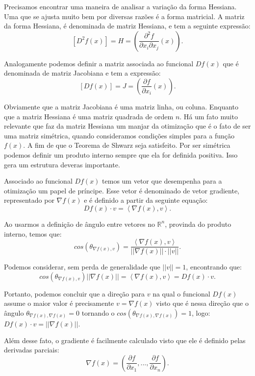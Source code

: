 \par Precisamos encontrar uma maneira de analisar a variação da forma Hessiana. Uma que se ajusta muito bem por diversas razões é a forma matricial. A matriz da forma Hessiana, é denominada de matriz Hessiana, e tem a seguinte expressão:
$$[D^2f(x)] = H = \left(\frac{\partial^2 f}{\partial x_i \partial x_j }(x)\right).$$
\par Analogamente podemos definir a matriz associada ao funcional $Df(x)$ que é denominada de matriz Jacobiana e tem a expressão:
$$[Df(x)] = J = \left(\frac{\partial f}{\partial x_i}(x)\right).$$
\par Obviamente que a matriz Jacobiana é uma matriz linha, ou coluna. Enquanto que a matriz Hessiana é uma matriz quadrada de ordem $n$. Há um fato muito relevante que faz da matriz Hessiana um manjar da otimização que é o fato de ser uma matriz simétrica, quando consideramos condições simples para a função $f(x)$. A fim de que o Teorema de Shwarz seja satisfeito. Por ser simétrica podemos definir um produto interno sempre que ela for definida positiva. Isso gera um estrutura deveras importante. 
\par Associado ao funcional $Df(x)$ temos um vetor que desempenha para a otimização um papel de príncipe. Esse vetor é denominado de vetor gradiente, representado por $\nabla f(x)$ e é definido a partir da seguinte equação:
$$Df(x) \cdot v = \left\langle \nabla f(x), v\right\rangle.$$
\par Ao usarmos a definição de ângulo entre vetores no $\mathbb{R}^n$, provinda do produto interno, temos que:
$$cos(\theta_{\nabla f(x),v}) = \frac{\left\langle \nabla f(x), v\right\rangle}{||\nabla f(x)||\cdot ||v||}.$$
\par Podemos considerar, sem perda de generalidade que $||v||=1$, encontrando que:
$$cos(\theta_{\nabla f(x),v})  ||\nabla f(x)|| = \left\langle \nabla f(x), v\right\rangle = Df(x) \cdot v .$$
\par Portanto, podemos concluir que a direção para $v$ na qual o funcional $Df(x)$ assume o maior valor é precisamente $v = \nabla f(x)$ visto que é nessa direção que o ângulo $\theta_{\nabla f(x),\nabla f(x)} = 0$ tornando o $cos(\theta_{\nabla f(x),\nabla f(x)}) =1$, logo: $Df(x) \cdot v = ||\nabla f(x)||$. 
\par Além desse fato, o gradiente é facilmente calculado visto que ele é definido pelas derivadas parciais: 
$$\nabla f(x) = \left(\frac{\partial f}{\partial x_1}, ..., \frac{\partial f}{\partial x_n}\right).$$

